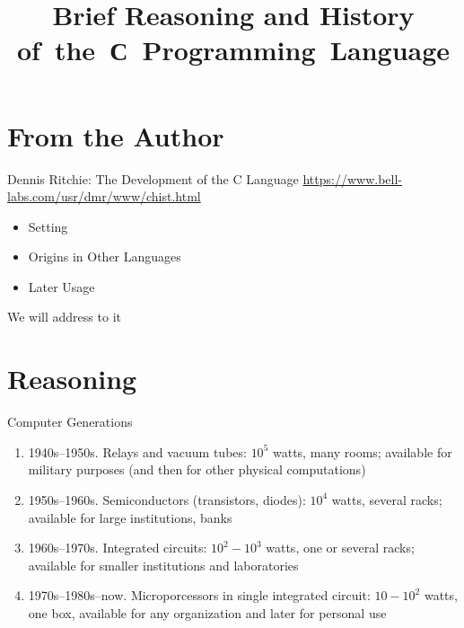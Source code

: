 \documentclass[xetex,aspectratio=149]{beamer}
\title[C History]{Brief Reasoning and History of~the~С~Programming~Language}
\begin{document}
\titleslide

\tocslide

\section{From the Author}

\begin{frame}{Dennis Ritchie: The Development of the C Language}
	\url{https://www.bell-labs.com/usr/dmr/www/chist.html}
	\begin{itemize}
		\item Setting
		\item Origins in Other Languages
		\item Later Usage
	\end{itemize}
	We will address to it
\end{frame}

\section{Reasoning}

\begin{frame}{Computer Generations}
	\begin{enumerate}
		\item 1940s--1950s. Relays and vacuum tubes: $10^5$ watts, many rooms; available for military purposes (and then for other physical computations)
		\item 1950s--1960s. Semiconductors (transistors, diodes): $10^4$ watts, several racks; available for large institutions, banks
		\item 1960s--1970s. Integrated circuits: $10^2-10^3$ watts, one or several racks; available for smaller institutions and laboratories
		\item 1970s--1980s--now. Microporcessors in single integrated circuit: $10-10^2$ watts,
		one box, available for any organization and later for personal use
	\end{enumerate}
\end{frame}
\end{document}
